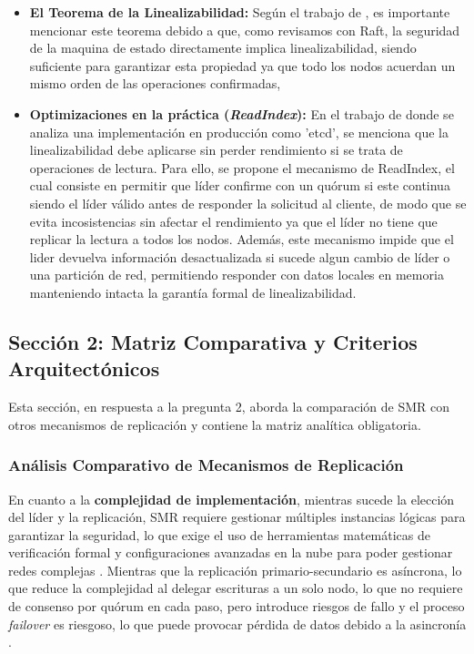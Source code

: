 \documentclass[12pt,letterpaper]{article}
\begin{document}
\begin{enumerate}
    
    \begin{itemize}
        \item \textbf{El Teorema de la Linealizabilidad:} Según el trabajo de \cite{woos2016}, es importante mencionar este teorema debido a que, como revisamos con Raft, la seguridad de la maquina de estado directamente implica linealizabilidad, siendo suficiente para garantizar esta propiedad ya que todo los nodos acuerdan un mismo orden de las operaciones confirmadas,

        
        \item \textbf{Optimizaciones en la práctica (\textit{ReadIndex}):} 
        En el trabajo de \cite{lebow2025}  donde se analiza una implementación en producción como 'etcd', se menciona que la linealizabilidad debe aplicarse sin perder rendimiento si se trata de operaciones de lectura. Para ello, se propone el mecanismo de ReadIndex, el cual consiste en permitir que líder confirme con un quórum si este continua siendo el líder válido antes de responder la solicitud al cliente, de modo que se evita incosistencias sin afectar el rendimiento ya que el líder no tiene que replicar la lectura a todos los nodos. Además, este mecanismo impide que el lider devuelva información desactualizada si sucede algun cambio de líder o una partición de red, permitiendo responder con datos locales en memoria manteniendo intacta la garantía formal de linealizabilidad.
    \end{itemize}
\end{enumerate}



\subsection{Sección 2: Matriz Comparativa y Criterios Arquitectónicos}
\label{sec:seccion2}

Esta sección, en respuesta a la pregunta 2, aborda la comparación de SMR con otros mecanismos de replicación y contiene la matriz analítica obligatoria.

\subsubsection{Análisis Comparativo de Mecanismos de Replicación}

En cuanto a la \textbf{complejidad de implementación}, mientras sucede la elección del líder y la replicación, SMR requiere gestionar múltiples instancias lógicas para garantizar la seguridad, lo que exige el uso de herramientas matemáticas de verificación formal \cite{woos2016} y configuraciones avanzadas en la nube para poder gestionar redes complejas \cite{liang2025}. Mientras que la replicación primario-secundario es asíncrona, lo que reduce la complejidad al delegar escrituras a un solo nodo, lo que no requiere de consenso por quórum en cada paso, pero introduce riesgos de fallo y el proceso \textit{failover} es riesgoso, lo que puede provocar pérdida de datos debido a la asincronía \cite{brooker2020}.
\end{document}
